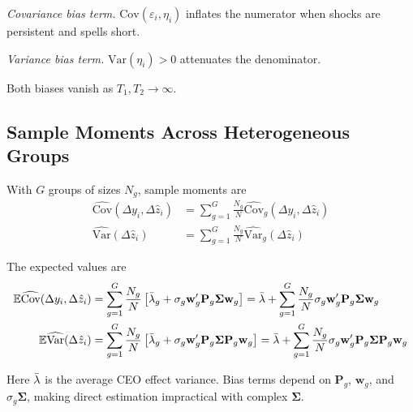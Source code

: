 \documentclass[11pt,a4paper]{article}
\newcommand{\Var}{\text{Var}}
\newcommand{\Cov}{\text{Cov}}
\begin{document}
\textit{Covariance bias term.} $\Cov(\varepsilon_i,\eta_i)$ inflates the numerator when shocks are persistent and spells short.

\textit{Variance bias term.} $\Var(\eta_i)>0$ attenuates the denominator.

Both biases vanish as $T_1,T_2\to\infty$. 

\subsection{Sample Moments Across Heterogeneous Groups}

With $G$ groups of sizes $N_g$, sample moments are
\begin{align}
\widehat{\Cov}(\Delta y_i,\Delta \hat z_i) &= \sum_{g=1}^G \frac{N_g}{N} \widehat{\Cov}_g(\Delta y_i,\Delta \hat z_i)\\
\widehat{\Var}(\Delta \hat z_i) &= \sum_{g=1}^G \frac{N_g}{N} \widehat{\Var}_g(\Delta \hat z_i)
\end{align}

The expected values are
\begin{align}
\mathbb E\widehat{\Cov}(\Delta y_i,\Delta \hat z_i) &= \sum_{g=1}^G \frac{N_g}{N} \left[ 
\Bar\lambda_g
+ \sigma_g \mathbf w_g' \mathbf P_g\mathbf\Sigma \mathbf w_g\right] = 
\Bar\lambda +\sum_{g=1}^G \frac{N_g}{N} \sigma_g \mathbf w_g' \mathbf P_g\mathbf\Sigma \mathbf w_g\\
\mathbb E\widehat{\Var}(\Delta \hat z_i) &= \sum_{g=1}^G \frac{N_g}{N} \left[ 
\Bar\lambda_g
+ \sigma_g \mathbf w_g' \mathbf P_g\mathbf\Sigma \mathbf P_g \mathbf w_g\right] = 
\Bar\lambda +\sum_{g=1}^G \frac{N_g}{N} \sigma_g \mathbf w_g' \mathbf P_g\mathbf\Sigma \mathbf P_g \mathbf w_g
\end{align}

Here $\Bar\lambda$ is the average CEO effect variance. Bias terms depend on $\mathbf P_g$, $\mathbf w_g$, and $\sigma_g\mathbf\Sigma$, making direct estimation impractical with complex $\mathbf\Sigma$.

\clearpage
\end{document}
